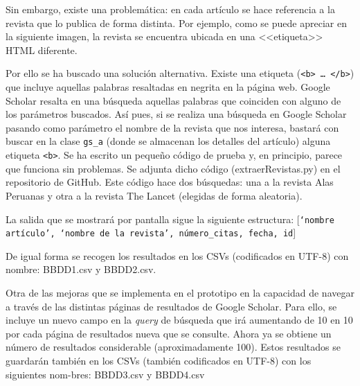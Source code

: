 
Sin embargo, existe una problemática: en cada artículo se hace referencia a la revista que lo publica de forma distinta. Por ejemplo, como se puede apreciar en la siguiente imagen, la revista se encuentra ubicada en una <<etiqueta>> HTML diferente.


Por ello se ha buscado una solución alternativa.
Existe una etiqueta (\texttt{<b> … </b>}) que incluye aquellas palabras resaltadas en negrita en la página web. Google Scholar resalta en una búsqueda aquellas palabras que coinciden con alguno de los parámetros buscados. Así pues, si se realiza una búsqueda en Google Scholar pasando como parámetro el nombre de la revista que nos interesa, bastará con buscar en la clase  \texttt{gs\_a} (donde se almacenan los detalles del artículo) alguna etiqueta \texttt{<b>}.
Se ha escrito un pequeño código de prueba y, en principio, parece que funciona sin problemas. Se adjunta dicho código (extraerRevistas.py) en el repositorio de GitHub.
Este código hace dos búsquedas: una a la revista Alas Peruanas y otra a la revista The Lancet (elegidas de forma aleatoria).



La salida que se mostrará por pantalla sigue la siguiente estructura: [\texttt{‘nombre artículo’, ‘nombre de la revista’, número\_citas, fecha, id}]

De igual forma se recogen los resultados en los CSVs (codificados en UTF-8) con nombre: BBDD1.csv y BBDD2.csv.



Otra de las mejoras que se implementa en el prototipo en la capacidad de navegar a través de las distintas páginas de resultados de Google Scholar. Para ello, se incluye un nuevo campo en la \textit{query} de búsqueda que irá aumentando de 10 en 10 por cada página de resultados nueva que se consulte.
Ahora ya se obtiene un número de resultados considerable (aproximadamente 100). Estos resultados se guardarán también en los CSVs (también codificados en UTF-8) con los siguientes nom-bres: BBDD3.csv y BBDD4.csv

